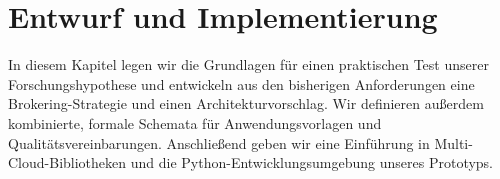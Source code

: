 \chapter{Entwurf und Implementierung}
\label{cha:implementierung}

In diesem Kapitel legen wir die Grundlagen für einen praktischen Test unserer Forschungshypothese und entwickeln aus den bisherigen Anforderungen eine Brokering-Strategie und einen Architekturvorschlag. Wir definieren außerdem kombinierte, formale Schemata für Anwendungsvorlagen und Qualitätsvereinbarungen. Anschließend geben wir eine Einführung in Multi-Cloud-Bibliotheken und die Python-Ent\-wick\-lungs\-um\-ge\-bung unseres Prototyps.









